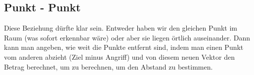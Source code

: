 \subsection{Punkt - Punkt}
Diese Beziehung dürfte klar sein. Entweder haben wir den gleichen Punkt im Raum (was sofort erkennbar wäre) oder aber sie liegen örtlich auseinander. Dann kann man angeben, wie weit die Punkte entfernt sind, indem man einen Punkt vom anderen abzieht (Ziel minus Angriff) und von diesem neuen Vektor den Betrag berechnet, um zu berechnen, um den Abstand zu bestimmen.
